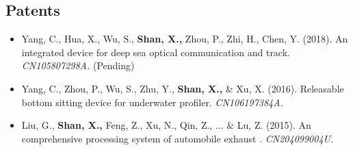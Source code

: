 \documentclass[11pt,a4paper,sans]{moderncv}         %
\begin{document}
\subsection{Patents} 

    \begin{itemize}

    \item{Yang, C., Hua, X., Wu, S., \textbf{Shan, X.,} Zhou, P., Zhi, H., Chen, Y. (2018). An integrated device for deep sea optical communication and track. \textit{CN105807298A.} (Pending)}

    \vspace{3pt}

    \item{Yang, C., Zhou, P., Wu, S., Zhu, Y., \textbf{Shan, X.,} \& Xu, X. (2016). Releasable bottom sitting device for underwater profiler. \textit{CN106197384A.}}

    \vspace{3pt}

    \item{Liu, G., \textbf{Shan, X.,} Feng, Z., Xu, N., Qin, Z., ... \& Lu, Z. (2015). An comprehensive processing system of automobile exhaust . \textit{CN204099004U.}}

    \vspace{3pt}

\end{itemize}


    

\end{document}
